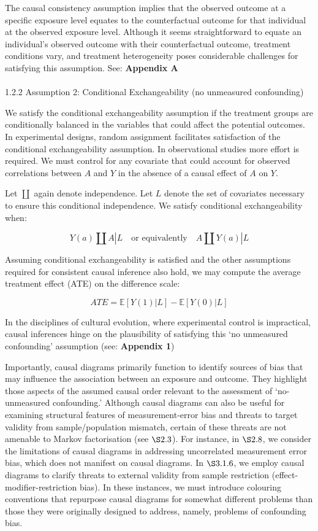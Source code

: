 \documentclass[
  singlecolumn]{article}
\makeatletter
\let\oldparagraph\paragraph
\renewcommand{\paragraph}{
    \@ifstar
      \xxxParagraphStar
      \xxxParagraphNoStar
  }
\newcommand{\xxxParagraphStar}[1]{\oldparagraph*{#1}\mbox{}}
\newcommand{\xxxParagraphNoStar}[1]{\oldparagraph{#1}\mbox{}}
\makeatother
\begin{document}
The causal consistency assumption implies that the observed outcome at a
specific exposure level equates to the counterfactual outcome for that
individual at the observed exposure level. Although it seems
straightforward to equate an individual's observed outcome with their
counterfactual outcome, treatment conditions vary, and treatment
heterogeneity poses considerable challenges for satisfying this
assumption. See: \textbf{Appendix A}

\paragraph{1.2.2 Assumption 2: Conditional Exchangeability (no
unmeasured
confounding)}\label{assumption-2-conditional-exchangeability-no-unmeasured-confounding}

We satisfy the conditional exchangeability assumption if the treatment
groups are conditionally balanced in the variables that could affect the
potential outcomes. In experimental designs, random assignment
facilitates satisfaction of the conditional exchangeability assumption.
In observational studies more effort is required. We must control for
any covariate that could account for observed correlations between \(A\)
and \(Y\) in the absence of a causal effect of \(A\) on \(Y\).

Let \(\coprod\) again denote independence. Let \(L\) denote the set of
covariates necessary to ensure this conditional independence. We satisfy
conditional exchangeability when:

\[
Y(a) \coprod A | L \quad \text{or equivalently} \quad A \coprod Y(a) | L
\]

Assuming conditional exchangeability is satisfied and the other
assumptions required for consistent causal inference also hold, we may
compute the average treatment effect (ATE) on the difference scale:

\[
ATE = \mathbb{E}[Y(1) | L] - \mathbb{E}[Y(0) | L]
\]

In the disciplines of cultural evolution, where experimental control is
impractical, causal inferences hinge on the plausibility of satisfying
this `no unmeasured confounding' assumption (see: \textbf{Appendix 1})

Importantly, causal diagrams primarily function to identify sources of
bias that may influence the association between an exposure and outcome.
They highlight those aspects of the assumed causal order relevant to the
assessment of `no-unmeasured confounding.' Although causal diagrams can
also be useful for examining structural features of measurement-error
bias and threats to target validity from sample/population mismatch,
certain of these threats are not amenable to Markov factorisation (see
\(\S 2.3\)). For instance, in \(\S 2.8\), we consider the limitations of
causal diagrams in addressing uncorrelated measurement error bias, which
does not manifest on causal diagrams. In \(\S 3.1.6\), we employ causal
diagrams to clarify threats to external validity from sample restriction
(effect-modifier-restriction bias). In these instances, we must
introduce colouring conventions that repurpose causal diagrams for
somewhat different problems than those they were originally designed to
address, namely, problems of confounding bias.
\end{document}
